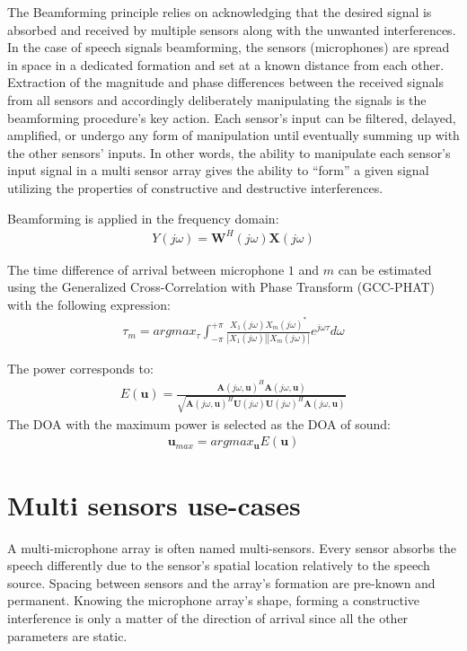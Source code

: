 The Beamforming principle relies on 
acknowledging that the desired signal 
is absorbed and received by multiple sensors 
along with the unwanted interferences. 
In the case of speech signals beamforming, 
the sensors (microphones) are spread in space in 
a dedicated formation and set at a 
known distance from each other.
Extraction of the magnitude and phase 
differences between the received signals from all sensors 
and accordingly deliberately manipulating the signals is the 
beamforming procedure's key action. 
Each sensor's input can be filtered, delayed, amplified, 
or undergo any form of manipulation 
until eventually summing up with the other sensors' inputs.
In other words, the ability to manipulate each sensor's 
input signal in a multi sensor array gives the ability
to ``form'' a given signal
utilizing the properties of constructive and destructive
interferences. 

Beamforming is applied in the frequency domain: 
\begin{align}
    Y(j\omega) = \mathbf{W}^H(j\omega)\mathbf{X}(j\omega)
\end{align}

The time difference of arrival between 
microphone \(1\) and \(m\) can be estimated 
using the Generalized Cross-Correlation 
with Phase Transform (GCC-PHAT) 
with the following expression:
\begin{align}
\displaystyle\tau_m = argmax_{\tau} \int_{-\pi}^{+\pi}{\frac{X_1(j\omega) X_m(j\omega)^*}{|X_1(j\omega)||X_m(j\omega)|}e^{j\omega\tau}}d\omega
\end{align}

The power corresponds to: 
\begin{align}
    \displaystyle E(\mathbf{u}) = \frac{\mathbf{A}(j\omega,\mathbf{u})^H \mathbf{A}(j\omega,\mathbf{u})}{\sqrt{\mathbf{A}(j\omega,\mathbf{u})^H \mathbf{U}(j\omega)\mathbf{U}(j\omega)^H\mathbf{A}(j\omega,\mathbf{u})}}
\end{align}
The DOA with the maximum power is selected as the DOA of sound:
\begin{align}
    \mathbf{u}_{max} = argmax_{\mathbf{u}}{E(\mathbf{u})}
\end{align}

\section{Multi sensors use-cases}
A multi-microphone array is often named multi-sensors. Every sensor
absorbs the speech differently due to the sensor's spatial location
relatively to the speech source. 
Spacing between sensors and the array's 
formation are pre-known and permanent. 
Knowing the microphone array's shape, 
forming a constructive interference 
is only a matter of the direction of 
arrival since all the other parameters are static.


